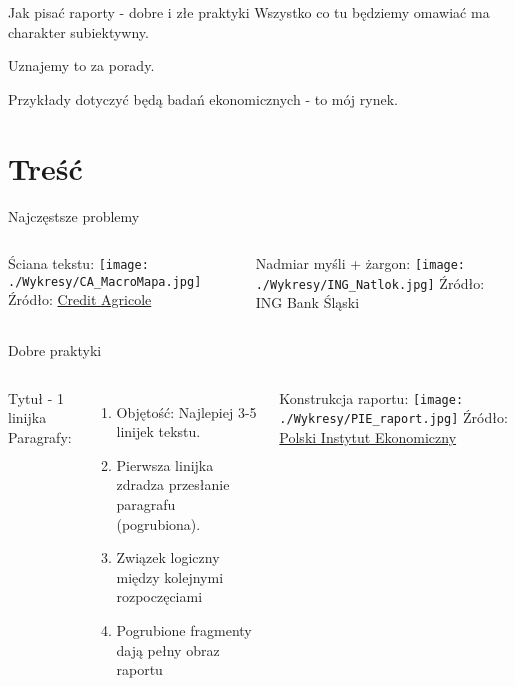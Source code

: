 \documentclass{beamer}
\begin{document}
\begin{frame}{Jak pisać raporty - dobre i złe praktyki}
	\centering
	Wszystko co tu będziemy omawiać ma charakter subiektywny.
	
	\vspace{5 mm}
	Uznajemy to za porady.
	
	\vspace{5 mm}
	Przykłady dotyczyć będą badań ekonomicznych - to mój rynek.
\end{frame}

\section{Treść}
\begin{frame}{Najczęstsze problemy}
	\begin{columns}[t]
		\centering
		Ściana tekstu:
		\texttt{[image: ./Wykresy/CA\_MacroMapa.jpg]}
		\tiny
		Źródło: \href{https://static.credit-agricole.pl/asset/m/a/k/makromapa-20220214_22757.pdf}{Credit Agricole}  
		
		\centering
		Nadmiar myśli + żargon:
		\texttt{[image: ./Wykresy/ING\_Natlok.jpg]}	
		\tiny
		Źródło: ING Bank Śląski
	\end{columns}
\end{frame}

\begin{frame}{Dobre praktyki}
	\begin{columns}[t]
		Tytuł - 1 linijka		
		\\
		\vspace{5mm}
		Paragrafy:
		\begin{enumerate} 
			\item Objętość: Najlepiej 3-5 linijek tekstu.
			\item Pierwsza linijka zdradza przesłanie paragrafu (pogrubiona).
			\item Związek logiczny między kolejnymi rozpoczęciami
			\item Pogrubione fragmenty dają pełny obraz raportu
		\end{enumerate}		
	
		\centering
		Konstrukcja raportu:
		\texttt{[image: ./Wykresy/PIE\_raport.jpg]}
		\tiny
		Źródło: \href{https://pie.net.pl/wp-content/uploads/2021/12/PIE-Przeglad_gospodarczy_2-2021.pdf}{Polski Instytut Ekonomiczny}  
	\end{columns}
\end{frame}
\end{document}
